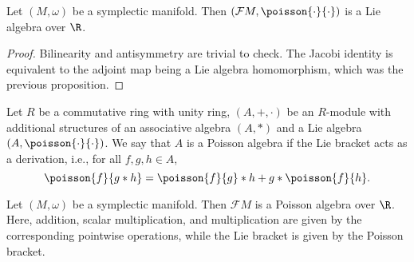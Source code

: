 \begin{corollary}
  Let $(M, \omega)$ be a symplectic manifold.
  Then $(\mathcal{F} M, \poisson{\cdot}{\cdot})$ is a Lie algebra over $\R$.
\end{corollary}
\begin{proof}
  Bilinearity and antisymmetry are trivial to check.
  The Jacobi identity is equivalent to the adjoint map being a Lie algebra
  homomorphism, which was the previous proposition.
\end{proof}
\begin{definition}
  Let
    $R$ be a commutative ring with unity ring,
    $(A, +, \cdot)$ be an $R$-module
    with additional structures of
    an associative algebra $(A, *)$ and
    a Lie algebra $(A, \poisson{\cdot}{\cdot})$.
  We say that $A$ is a Poisson algebra if the Lie bracket acts as a derivation,
  i.e., for all $f, g, h \in A$,
  \begin{equation}
    \poisson{f}{g * h} = \poisson{f}{g} * h + g * \poisson{f}{h}.
  \end{equation}
\end{definition}
\begin{corollary}
  Let $(M, \omega)$ be a symplectic manifold.
  Then $\mathcal{F} M$ is a Poisson algebra over $\R$.
  Here, addition, scalar multiplication, and multiplication are given by the
  corresponding pointwise operations, while the Lie bracket is given by the
  Poisson bracket.
\end{corollary}
